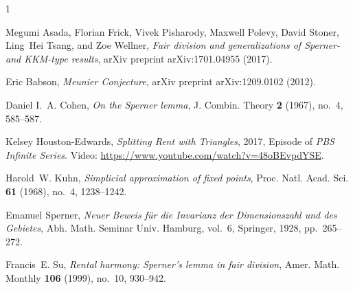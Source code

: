 \documentclass[a4paper,10pt,reqno, english]{amsart}
\theoremstyle{plain}
\theoremstyle{definition}
\begin{document}
\small

\begin{thebibliography}{1}

Megumi Asada, Florian Frick, Vivek Pisharody, Maxwell Polevy, David Stoner,
  Ling~Hei Tsang, and Zoe Wellner, \emph{{Fair division and generalizations of
  Sperner- and KKM-type results}}, arXiv preprint arXiv:1701.04955 (2017).
  
Eric Babson, \emph{{Meunier Conjecture}}, arXiv preprint arXiv:1209.0102 (2012).

Daniel I.~A. Cohen, \emph{On the Sperner lemma}, J. Combin. Theory \textbf{2}
  (1967), no.~4, 585--587.

Kelsey Houston-Edwards, \emph{{Splitting Rent with Triangles}}, 2017, Episode
  of {\emph{PBS Infinite Series}}. Video:
  {\url{https://www.youtube.com/watch?v=48oBEvpdYSE}}.

Harold~W. Kuhn, \emph{Simplicial approximation of fixed points}, Proc. Natl.
  Acad. Sci. \textbf{61} (1968), no.~4, 1238--1242.

Emanuel Sperner, \emph{{Neuer Beweis f{\"u}r die Invarianz der Dimensionszahl
  und des Gebietes}}, Abh. Math. Seminar Univ. Hamburg, vol.~6, Springer, 1928,
  pp.~265--272.

Francis~E. Su, \emph{Rental harmony: Sperner's lemma in fair division},
  Amer. Math. Monthly \textbf{106} (1999), no.~10, 930--942.

\end{thebibliography}
\end{document}
